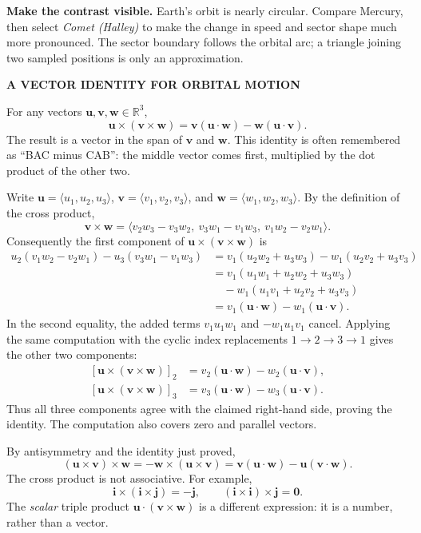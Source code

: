 \documentclass[11pt,letterpaper]{article}
\newcommand{\heading}[1]{\vspace{3pt}{\large\bfseries #1}\par}
\newcommand{\subhead}[1]{\textbf{#1}\quad}
\newcommand{\tagline}[1]{{\small\bfseries\color{inkblue}#1}\par}
\begin{document}
\subhead{Make the contrast visible.} Earth's orbit is nearly circular. Compare Mercury, then select \emph{Comet (Halley)} to make the change in speed and sector shape much more pronounced. The sector boundary follows the orbital arc; a triangle joining two sampled positions is only an approximation.

\newpage
\tagline{A VECTOR IDENTITY FOR ORBITAL MOTION}
\heading{The vector triple-product identity}
For any vectors $\mathbf u,\mathbf v,\mathbf w\in\mathbb R^3$,
\[
 \boxed{\mathbf u\times(\mathbf v\times\mathbf w)
 =\mathbf v(\mathbf u\cdot\mathbf w)
 -\mathbf w(\mathbf u\cdot\mathbf v).}
\]
The result is a vector in the span of $\mathbf v$ and $\mathbf w$. This identity is often remembered as ``BAC minus CAB'': the middle vector comes first, multiplied by the dot product of the other two.

\heading{Proof in coordinates}
Write $\mathbf u=\langle u_1,u_2,u_3\rangle$, $\mathbf v=\langle v_1,v_2,v_3\rangle$, and $\mathbf w=\langle w_1,w_2,w_3\rangle$. By the definition of the cross product,
\[
 \mathbf v\times\mathbf w
 =\langle v_2w_3-v_3w_2,\ v_3w_1-v_1w_3,\ v_1w_2-v_2w_1\rangle.
\]
Consequently the first component of $\mathbf u\times(\mathbf v\times\mathbf w)$ is
\begin{align*}
 u_2(v_1w_2-v_2w_1)-u_3(v_3w_1-v_1w_3)
 &=v_1(u_2w_2+u_3w_3)-w_1(u_2v_2+u_3v_3)\\
 &=v_1(u_1w_1+u_2w_2+u_3w_3)\\
 &\hspace{12pt}-w_1(u_1v_1+u_2v_2+u_3v_3)\\
 &=v_1(\mathbf u\cdot\mathbf w)-w_1(\mathbf u\cdot\mathbf v).
\end{align*}
In the second equality, the added terms $v_1u_1w_1$ and $-w_1u_1v_1$ cancel. Applying the same computation with the cyclic index replacements $1\to2\to3\to1$ gives the other two components:
\[
 \begin{aligned}
 [\mathbf u\times(\mathbf v\times\mathbf w)]_2
 &=v_2(\mathbf u\cdot\mathbf w)-w_2(\mathbf u\cdot\mathbf v),\\
 [\mathbf u\times(\mathbf v\times\mathbf w)]_3
 &=v_3(\mathbf u\cdot\mathbf w)-w_3(\mathbf u\cdot\mathbf v).
 \end{aligned}
\]
Thus all three components agree with the claimed right-hand side, proving the identity. The computation also covers zero and parallel vectors.

\heading{The parentheses matter}
By antisymmetry and the identity just proved,
\[
 (\mathbf u\times\mathbf v)\times\mathbf w
 =-\mathbf w\times(\mathbf u\times\mathbf v)
 =\mathbf v(\mathbf u\cdot\mathbf w)-\mathbf u(\mathbf v\cdot\mathbf w).
\]
The cross product is not associative. For example,
\[
 \mathbf i\times(\mathbf i\times\mathbf j)=-\mathbf j,
 \qquad (\mathbf i\times\mathbf i)\times\mathbf j=\mathbf0.
\]
The \emph{scalar} triple product $\mathbf u\cdot(\mathbf v\times\mathbf w)$ is a different expression: it is a number, rather than a vector.
\end{document}
